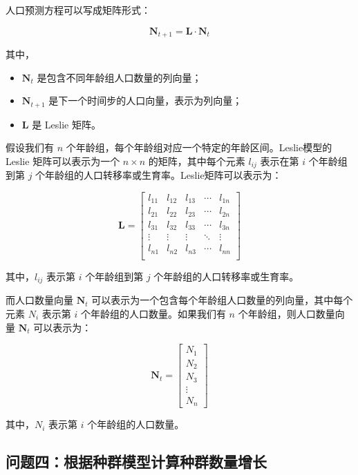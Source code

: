 \documentclass[a4,10pt,zihao=-4]{ctexart}
\begin{document}
人口预测方程可以写成矩阵形式：

\begin{equation*}
    \mathbf{N}_{t+1} = \mathbf{L} \cdot \mathbf{N}_t
\end{equation*}

其中，
\begin{itemize}
    \item \(\mathbf{N}_t\) 是包含不同年龄组人口数量的列向量；
    \item \(\mathbf{N}_{t+1}\) 是下一个时间步的人口向量，表示为列向量；
    \item \(\mathbf{L}\) 是 Leslie 矩阵。
\end{itemize}

假设我们有 \(n\) 个年龄组，每个年龄组对应一个特定的年龄区间。Leslie模型的 Leslie 矩阵可以表示为一个 \(n \times n\) 的矩阵，其中每个元素 \(l_{ij}\) 表示在第 \(i\) 个年龄组到第 \(j\) 个年龄组的人口转移率或生育率。Leslie矩阵可以表示为：

\[
\mathbf{L} = \begin{bmatrix}
l_{11} & l_{12} & l_{13} & \cdots & l_{1n} \\
l_{21} & l_{22} & l_{23} & \cdots & l_{2n} \\
l_{31} & l_{32} & l_{33} & \cdots & l_{3n} \\
\vdots & \vdots & \vdots & \ddots & \vdots \\
l_{n1} & l_{n2} & l_{n3} & \cdots & l_{nn} \\
\end{bmatrix}
\]

其中，\(l_{ij}\) 表示第 \(i\) 个年龄组到第 \(j\) 个年龄组的人口转移率或生育率。

而人口数量向量 \( \mathbf{N}_t \) 可以表示为一个包含每个年龄组人口数量的列向量，其中每个元素 \( N_i \) 表示第 \( i \) 个年龄组的人口数量。如果我们有 \( n \) 个年龄组，则人口数量向量 \( \mathbf{N}_t \) 可以表示为：

\[
\mathbf{N}_t = \begin{bmatrix}
N_1 \\
N_2 \\
N_3 \\
\vdots \\
N_n
\end{bmatrix}
\]

其中，\( N_i \) 表示第 \( i \) 个年龄组的人口数量。

\subsection{问题四：根据种群模型计算种群数量增长}
\end{document}
